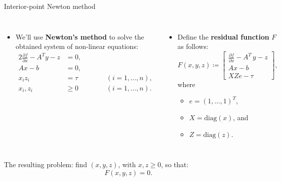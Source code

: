 %
%
\begin{frame}{Interior-point Newton method}
\begin{columns}[t]

\begin{itemize}
\item We'll use \alert{\bf Newton's method} to solve 
the obtained system of non-linear equations:
%
\begin{alignat*}{2}
\frac{\partial f}{\partial x} - A^{T}y-z & =0, & \qquad\\
Ax-b & =0,\\
x_{i}z_{i} & =\tau &  & (i=1,\ldots,n),\\
x_{i},z_{i} & \geq0 &  & (i=1,\ldots,n).
\end{alignat*}
%
\end{itemize}

\begin{itemize}
\item Define the \alert{\bf residual function} $F$ as follows:
\[
F(x,y,z)\coloneqq
\begin{bmatrix}
\frac{\partial f}{\partial x} - A^{T}\,y-z\\
Ax-b\\
XZe-\tau
\end{bmatrix}, 
\]
%
where 
\begin{itemize}
\item $e=(1,\ldots,1)^{T}$,
\item $X=\text{diag}(x)$, and 
\item $Z=\text{diag}(z)$.
\end{itemize}
\end{itemize}
\end{columns}
\vskip 10pt
\begin{tcolorbox}
	The resulting problem: find $(x,y,z)$, with $x,z\geq0$, so that: 
	\[
	F(x,y,z)=0.
	\]
\end{tcolorbox}

\end{frame}
